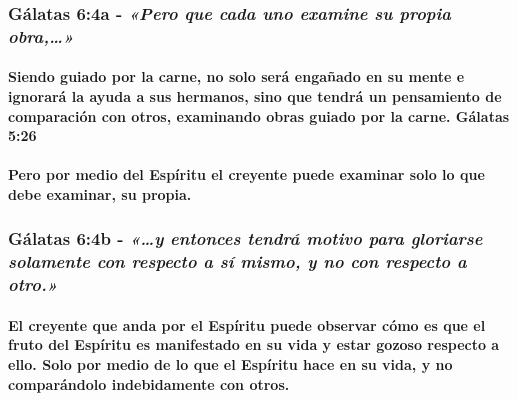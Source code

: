 \documentclass[11a pt,twoside]{article}
\newcommand{\scripture}[1]{%
  {\fontsize{12pt}{16pt}\selectfont\ScriptureFont\itshape #1}%
}
\let\oldsubsubsection\subsubsection
\renewcommand{\subsubsection}{\needspace{4\baselineskip}\oldsubsubsection}
\let\oldparagraph\paragraph
\renewcommand{\paragraph}{\needspace{3\baselineskip}\oldparagraph}
\begin{document}
\subsubsection{\texorpdfstring{Gálatas 6:4a -
\scripture{«Pero que cada uno examine su propia obra,…»}}{Gálatas 6:4a - }}\label{guxe1latas-64a---pero-que-cada-uno-examine-su-propia-obra}

\paragraph{Siendo guiado por la carne, no solo será engañado en su mente
e ignorará la ayuda a sus hermanos, sino que tendrá un pensamiento de
comparación con otros, examinando obras guiado por la carne. Gálatas
5:26}\label{siendo-guiado-por-la-carne-no-solo-seruxe1-engauxf1ado-en-su-mente-e-ignoraruxe1-la-ayuda-a-sus-hermanos-sino-que-tendruxe1-un-pensamiento-de-comparaciuxf3n-con-otros-examinando-obras-guiado-por-la-carne.-guxe1latas-526}

\paragraph{Pero por medio del Espíritu el creyente puede examinar solo
lo que debe examinar, su
propia.}\label{pero-por-medio-del-espuxedritu-el-creyente-puede-examinar-solo-lo-que-debe-examinar-su-propia.}

\subsubsection{\texorpdfstring{Gálatas 6:4b -
\scripture{«…y entonces tendrá motivo para gloriarse solamente con respecto a sí mismo, y no con respecto a otro.»}}{Gálatas 6:4b - }}\label{guxe1latas-64b---y-entonces-tendruxe1-motivo-para-gloriarse-solamente-con-respecto-a-suxed-mismo-y-no-con-respecto-a-otro.}

\paragraph{El creyente que anda por el Espíritu puede observar cómo es
que el fruto del Espíritu es manifestado en su vida y estar gozoso
respecto a ello. Solo por medio de lo que el Espíritu hace en su vida, y
no comparándolo indebidamente con
otros.}\label{el-creyente-que-anda-por-el-espuxedritu-puede-observar-cuxf3mo-es-que-el-fruto-del-espuxedritu-es-manifestado-en-su-vida-y-estar-gozoso-respecto-a-ello.-solo-por-medio-de-lo-que-el-espuxedritu-hace-en-su-vida-y-no-comparuxe1ndolo-indebidamente-con-otros.}
\end{document}
